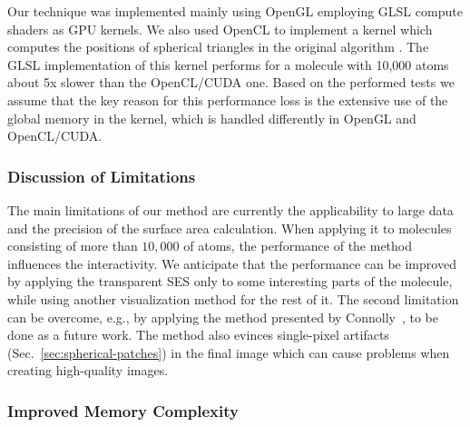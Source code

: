 Our technique was implemented mainly using OpenGL employing GLSL compute shaders as GPU kernels.
We also used OpenCL to implement a kernel which computes the positions of spherical triangles in the original algorithm \cite{krone2011parallel}.
The GLSL implementation of this kernel performs for a molecule with {\tweakedsim}10,000 atoms about 5x slower than the OpenCL/CUDA one.
Based on the performed tests we assume that the key reason for this performance loss is the extensive use of the global memory in the kernel, which is handled differently in OpenGL and OpenCL/CUDA.

\subsubsection{Discussion of Limitations}
The main limitations of our method are currently the applicability to large data and the precision of the surface area calculation.
When applying it to molecules consisting of more than $10,000$ of atoms, the performance of the method influences the interactivity.
We anticipate that the performance can be improved by applying the transparent SES only to some interesting parts of the molecule, while using another visualization method for the rest of it.
The second limitation can be overcome, e.g., by applying the method presented by Connolly~\cite{connolly1983analytical}, to be done as a future work.
The method also evinces single-pixel artifacts (Sec.~\ref{sec:spherical-patches}) in the final image which can cause problems when creating high-quality images.

\subsubsection{Improved Memory Complexity}

